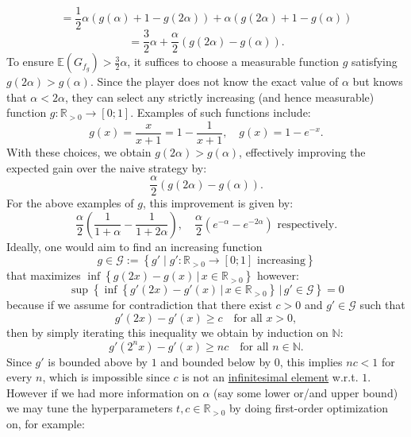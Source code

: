 \begin{solution}
\[    \]
    \[
        = \frac{1}{2} \alpha \left( g\left(\alpha\right) + 1 - g\left(2\alpha\right) \right) + \alpha \left( g\left(2\alpha\right) + 1 - g\left(\alpha\right) \right)
    \]
    \[
        = \frac{3}{2} \alpha + \frac{\alpha}{2} \left( g\left(2\alpha\right) - g\left(\alpha\right) \right).
    \]
    To ensure \( \mathbb{E}\left(G_{f_g}\right) > \frac{3}{2} \alpha \), it suffices to choose a measurable function \( g \) satisfying \( g\left(2\alpha\right) > g\left(\alpha\right) \). Since the player does not know the exact value of \( \alpha \) but knows that \( \alpha < 2\alpha \), they can select any strictly increasing (and hence measurable) function \( g: \mathbb{R}_{>0} \to \left[0;1\right] \). Examples of such functions include:
    \[
        g\left(x\right) =\frac{x}{x+1}=1-\frac{1}{x+1}, \quad g\left(x\right) = 1 - e^{-x}.
    \]
    With these choices, we obtain \( g\left(2\alpha\right) > g\left(\alpha\right) \), effectively improving the expected gain over the naive strategy by:
    \[
        \frac{\alpha}{2} \left( g\left(2\alpha\right) - g\left(\alpha\right) \right).
    \]
    For the above examples of \( g \), this improvement is given by:
    \[
        \frac{\alpha}{2} \left(\frac{1}{1+\alpha}- \frac{1}{1+2\alpha}\right), \quad \frac{\alpha}{2} \left( e^{-\alpha} - e^{-2\alpha} \right)\text{ respectively}.
    \]
    Ideally, one would aim to find an increasing function
    \[
        g\in\mathcal{G}:= \left\{g'\mid g':\mathbb{R}_{>0}\to\left[0;1\right]\text{ increasing}\right\}
    \]
    that maximizes \( \inf\left\{g\left(2x\right) - g\left(x\right)\,|\, x\in\mathbb{R}_{>0}\right\} \) however:
    \[
        \sup\left\{\inf\left\{g'\left(2x\right) - g'\left(x\right)\,|\, x\in\mathbb{R}_{>0}\right\}\,|\, g'\in\mathcal{G}\right\}=0
    \]
    because if we assume for contradiction that there exist \( c>0 \) and \( g'\in \mathcal{G} \) such that
    \[
        g'\left(2x\right)-g'\left(x\right)\ge c \quad \text{for all } x>0,
    \]
    then by simply iterating this inequality we obtain by induction on \( \mathbb{N} \):
    \[
        g'\left(2^n x\right)-g'\left(x\right) \ge nc \quad \text{for all } n\in\mathbb{N}.
    \]
    Since \( g' \) is bounded above by \( 1 \) and bounded below by \( 0 \), this implies \( nc< 1 \) for every \( n \), which is impossible since \( c \) is not an \href{https://en.wikipedia.org/wiki/Archimedean_property}{infinitesimal element} w.r.t. \( 1 \). However if we had more information on \( \alpha \) (say some lower or/and upper bound) we may tune the hyperparameters \( t,c\in\mathbb{R}_{>0} \) by doing first-order optimization on, for example: \\

\end{solution}
